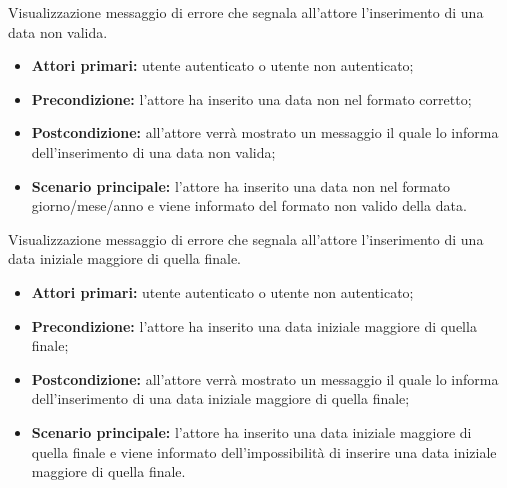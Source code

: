 Visualizzazione messaggio di errore che segnala all'attore l'inserimento di una data non valida.
\begin{itemize}
    \item \textbf{Attori primari:} utente autenticato o utente non autenticato;
    \item \textbf{Precondizione:} l'attore ha inserito una data non nel formato corretto;
    \item \textbf{Postcondizione:} all'attore verrà mostrato un messaggio il quale lo informa dell'inserimento di una data non valida;
    \item \textbf{Scenario principale:} l'attore ha inserito una data non nel formato giorno/mese/anno e viene informato del formato non valido della data.
\end{itemize}

Visualizzazione messaggio di errore che segnala all'attore l'inserimento di una data iniziale maggiore di quella finale.
\begin{itemize}
    \item \textbf{Attori primari:} utente autenticato o utente non autenticato;
    \item \textbf{Precondizione:} l'attore ha inserito una data iniziale maggiore di quella finale;
    \item \textbf{Postcondizione:} all'attore verrà mostrato un messaggio il quale lo informa dell'inserimento di una data iniziale maggiore di quella finale;
    \item \textbf{Scenario principale:} l'attore ha inserito una data iniziale maggiore di quella finale e viene informato dell'impossibilità di inserire una data iniziale maggiore di quella finale.
\end{itemize}

